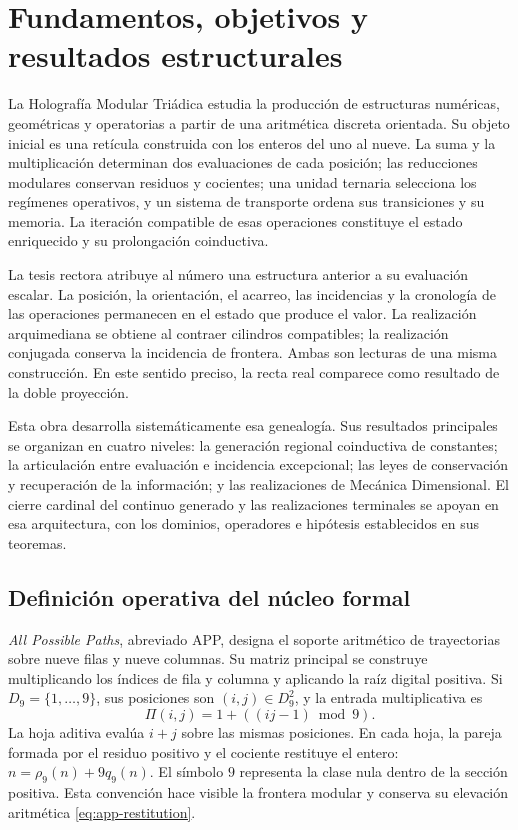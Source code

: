 \chapter*{Fundamentos, objetivos y resultados estructurales}
\label{hmt:sistematica:presentacion}

La Holografía Modular Triádica estudia la producción de estructuras
numéricas, geométricas y operatorias a partir de una aritmética discreta
orientada. Su objeto inicial es una retícula construida con los enteros del
uno al nueve. La suma y la multiplicación determinan dos evaluaciones de
cada posición; las reducciones modulares conservan residuos y cocientes;
una unidad ternaria selecciona los regímenes operativos, y un sistema de
transporte ordena sus transiciones y su memoria. La iteración compatible de
esas operaciones constituye el estado enriquecido y su prolongación
coinductiva.

La tesis rectora atribuye al número una estructura anterior a su evaluación
escalar. La posición, la orientación, el acarreo, las incidencias y la
cronología de las operaciones permanecen en el estado que produce el valor.
La realización arquimediana se obtiene al contraer cilindros compatibles;
la realización conjugada conserva la incidencia de frontera. Ambas son
lecturas de una misma construcción. En este sentido preciso, la recta real
comparece como resultado de la doble proyección.

Esta obra desarrolla sistemáticamente esa genealogía. Sus resultados
principales se organizan en cuatro niveles: la generación regional
coinductiva de constantes; la articulación entre evaluación e incidencia
excepcional; las leyes de conservación y recuperación de la información;
y las realizaciones de Mecánica Dimensional. El cierre cardinal del
continuo generado y las realizaciones terminales se apoyan en esa
arquitectura, con los dominios, operadores e hipótesis establecidos en sus
teoremas.

\section*{Definición operativa del núcleo formal}

\emph{All Possible Paths}, abreviado APP, designa el soporte aritmético
de trayectorias sobre nueve filas y nueve columnas. Su matriz principal
se construye multiplicando los índices de fila y columna y aplicando la
raíz digital positiva. Si \(D_9=\{1,\ldots,9\}\), sus posiciones son
\((i,j)\in D_9^2\), y la entrada multiplicativa es
\[
 \Pi(i,j)=1+((ij-1)\bmod9).
\]
La hoja aditiva evalúa \(i+j\) sobre las mismas posiciones. En cada hoja,
la pareja formada por el residuo positivo y el cociente restituye el
entero: \(n=\rho_9(n)+9q_9(n)\). El símbolo \(9\) representa la clase
nula dentro de la sección positiva. Esta convención hace visible la
frontera modular y conserva su elevación aritmética
\eqref{eq:app-restitution}.


